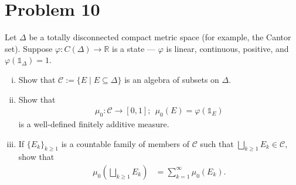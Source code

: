 \documentclass[10pt]{extarticle}
\newcommand{\R}{\mathbb{R}}
\begin{document}
  \section{Problem 10}%
  Let $\Delta$ be a totally disconnected compact metric space (for example, the Cantor set). Suppose $\varphi: C(\Delta)\rightarrow \R$ is a state --- $\varphi$ is linear, continuous, positive, and $\varphi\left(\mathbb{1}_{\Delta}\right) = 1$.
  \begin{enumerate}[(i)]
    \item Show that $\mathcal{C} := \{E\mid E\subseteq \Delta\}$ is an algebra of subsets on $\Delta$.
    \item Show that
      \begin{align*}
        \mu_0: \mathcal{C}\rightarrow [0,1];~~\mu_0(E) = \varphi\left(\mathbb{1}_{E}\right)
      \end{align*}
      is a well-defined finitely additive measure.
    \item If $\{E_k\}_{k\geq 1}$ is a countable family of members of $\mathcal{C}$ such that $\bigsqcup_{k\geq 1}E_k \in \mathcal{C}$, show that
      \begin{align*}
        \mu_0\left(\bigsqcup_{k\geq 1}E_k\right) &= \sum_{k=1}^{\infty}\mu_0(E_k).
      \end{align*}
  \end{enumerate}
\end{document}
